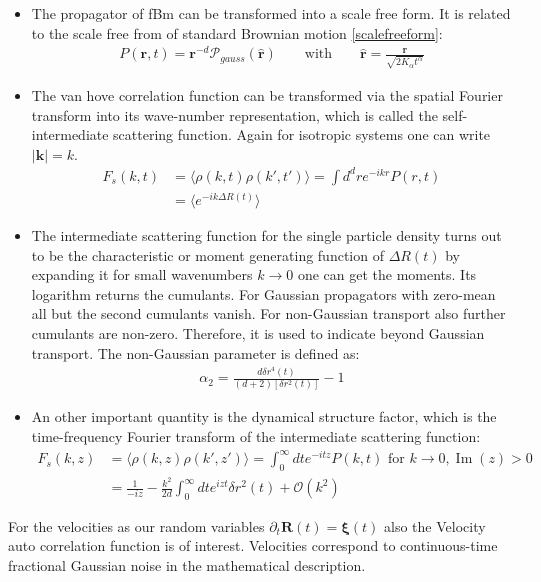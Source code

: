 \documentclass[
  a4paper,BCOR10mm,oneside,
  bibtotoc,idxtotoc,
  headsepline,footsepline,%
  fleqn,openbib
]{scrbook}
\begin{document}
\begin{itemize}
\item The propagator of fBm can be transformed into a scale free form. It is related to the scale free from of standard Brownian motion \cref{scalefreeform}:
\begin{align}
P(\bm{r},t)= \bm{r}^{-d} \mathcal{P}_{gauss}(\hat{\bm{r}})  \qquad \text{with} \qquad \hat{\bm{r}} = \frac{\bm{r}}{\sqrt{2 K_{\alpha} t^{\alpha}}} \label{scalefreeformfrac}
\end{align}
\item The van hove correlation function can be transformed via the spatial Fourier transform into its wave-number representation, which is called the self-intermediate scattering function. Again for isotropic systems one can write $|\bm{k}|=k$.
\begin{align}
 F_{s}(k,t)&=\langle\rho(k,t) \rho(k',t')\rangle=\int d^{d}r e^{-i k r} P(r,t) \\
 &=\langle e^{-i k \Delta R(t)} \rangle
\end{align}
\item 
The intermediate scattering function for the single particle density turns out to be the characteristic or moment generating function of $\Delta R(t)$ by expanding it for small wavenumbers $k \rightarrow 0$ one can get the moments. Its logarithm returns the cumulants. For Gaussian propagators with zero-mean all but the second cumulants vanish. For non-Gaussian transport also further cumulants are non-zero. Therefore, it is used to indicate beyond Gaussian transport. The non-Gaussian parameter is defined as:
\begin{align}
 \alpha_2=\frac{d \delta r^{4}(t)}{(d+2) [\delta r^{2}(t)]}-1 \label{nongaussian2}
\end{align}
\item
An other important quantity is the dynamical structure factor, which is the time-frequency Fourier transform of the intermediate scattering function:
\begin{align}
 F_{s}(k,z)&=\langle\rho(k,z) \rho(k',z')\rangle=\int_{0}^{\infty} d t e^{-i t z} P(k,t) \text{ for } k \rightarrow 0 , \operatorname{Im}(z) > 0 \label{dynamicstructurfactor}\\
 &= \frac{1}{-iz}-\frac{k^2}{2d}\int_{0}^{\infty} d t e^{izt} \delta r^2 (t) + \mathcal{O}(k^2)
\end{align}
\end{itemize}
For the velocities as our random variables $\partial_t \bm{R}(t)=\bm{\xi}(t)$ also the Velocity auto correlation function is of interest. Velocities correspond to continuous-time fractional Gaussian noise in the mathematical description.
\end{document}

